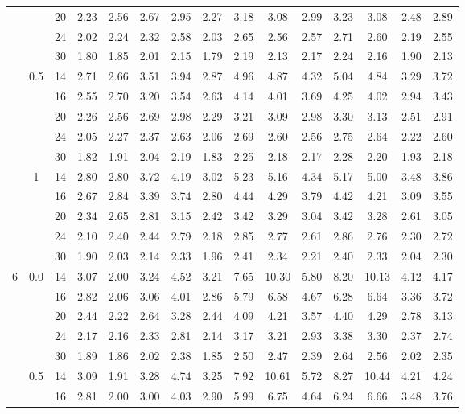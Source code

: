\documentclass[num-refs]{wiley-article}
\begin{document}
\begin{table}
\begin{tabular}[t]{ccccccccccccccc}
& & 20 & 2.23 & 2.56 & 2.67 & 2.95 & 2.27 & 3.18 & 3.08 & 2.99 & 3.23 & 3.08 & 2.48 & 2.89\\
& & 24 & 2.02 & 2.24 & 2.32 & 2.58 & 2.03 & 2.65 & 2.56 & 2.57 & 2.71 & 2.60 & 2.19 & 2.55\\
&& 30 & 1.80 & 1.85 & 2.01 & 2.15 & 1.79 & 2.19 & 2.13 & 2.17 & 2.24 & 2.16 & 1.90 & 2.13\\
\hline
 & 0.5 & 14 & 2.71 & 2.66 & 3.51 & 3.94 & 2.87 & 4.96 & 4.87 & 4.32 & 5.04 & 4.84 & 3.29 & 3.72\\
& & 16 & 2.55 & 2.70 & 3.20 & 3.54 & 2.63 & 4.14 & 4.01 & 3.69 & 4.25 & 4.02 & 2.94 & 3.43\\
& & 20 & 2.26 & 2.56 & 2.69 & 2.98 & 2.29 & 3.21 & 3.09 & 2.98 & 3.30 & 3.13 & 2.51 & 2.91\\
& & 24 & 2.05 & 2.27 & 2.37 & 2.63 & 2.06 & 2.69 & 2.60 & 2.56 & 2.75 & 2.64 & 2.22 & 2.60\\
&& 30 & 1.82 & 1.91 & 2.04 & 2.19 & 1.83 & 2.25 & 2.18 & 2.17 & 2.28 & 2.20 & 1.93 & 2.18\\
\hline
 & 1 & 14 & 2.80 & 2.80 & 3.72 & 4.19 & 3.02 & 5.23 & 5.16 & 4.34 & 5.17 & 5.00 & 3.48 & 3.86\\
& & 16 & 2.67 & 2.84 & 3.39 & 3.74 & 2.80 & 4.44 & 4.29 & 3.79 & 4.42 & 4.21 & 3.09 & 3.55\\
& & 20 & 2.34 & 2.65 & 2.81 & 3.15 & 2.42 & 3.42 & 3.29 & 3.04 & 3.42 & 3.28 & 2.61 & 3.05\\
&& 24 & 2.10 & 2.40 & 2.44 & 2.79 & 2.18 & 2.85 & 2.77 & 2.61 & 2.86 & 2.76 & 2.30 & 2.72\\
& & 30 & 1.90 & 2.03 & 2.14 & 2.33 & 1.96 & 2.41 & 2.34 & 2.21 & 2.40 & 2.33 & 2.04 & 2.30\\
\hline
6 & 0.0 & 14 & 3.07 & 2.00 & 3.24 & 4.52 & 3.21 & 7.65 & 10.30 & 5.80 & 8.20 & 10.13 & 4.12 & 4.17\\
& & 16 & 2.82 & 2.06 & 3.06 & 4.01 & 2.86 & 5.79 & 6.58 & 4.67 & 6.28 & 6.64 & 3.36 & 3.72\\
& & 20 & 2.44 & 2.22 & 2.64 & 3.28 & 2.44 & 4.09 & 4.21 & 3.57 & 4.40 & 4.29 & 2.78 & 3.13\\
& & 24 & 2.17 & 2.16 & 2.33 & 2.81 & 2.14 & 3.17 & 3.21 & 2.93 & 3.38 & 3.30 & 2.37 & 2.74\\
& & 30 & 1.89 & 1.86 & 2.02 & 2.38 & 1.85 & 2.50 & 2.47 & 2.39 & 2.64 & 2.56 & 2.02 & 2.35\\
\hline
 & 0.5 & 14 & 3.09 & 1.91 & 3.28 & 4.74 & 3.25 & 7.92 & 10.61 & 5.72 & 8.27 & 10.44 & 4.21 & 4.24\\
& & 16 & 2.81 & 2.00 & 3.00 & 4.03 & 2.90 & 5.99 & 6.75 & 4.64 & 6.24 & 6.66 & 3.48 & 3.76\\

\end{tabular}
\end{table}
\end{document}
